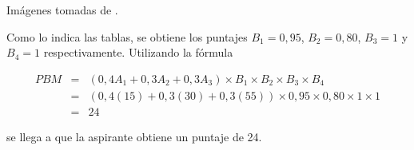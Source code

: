 \documentclass[
]{book}
\begin{document}
Imágenes tomadas de \citet{BibEntry2021Maria}.

Como lo indica las tablas, se obtiene los puntajes \(B_1=0,95\), \(B_2=0,80\), \(B_3=1\) y \(B_4=1\) respectivamente. Utilizando la fórmula

\[\begin{eqnarray}
PBM&=&(0,4A_1+0,3A_2+0,3A_3)\times B_1 \times B_2 \times B_3 \times B_4\\
&=& (0,4(15)+0,3(30)+0,3(55))\times 0,95 \times 0,80 \times 1 \times 1\\
&=& 24
\end{eqnarray}\]

se llega a que la aspirante obtiene un puntaje de 24.

  
\end{document}
